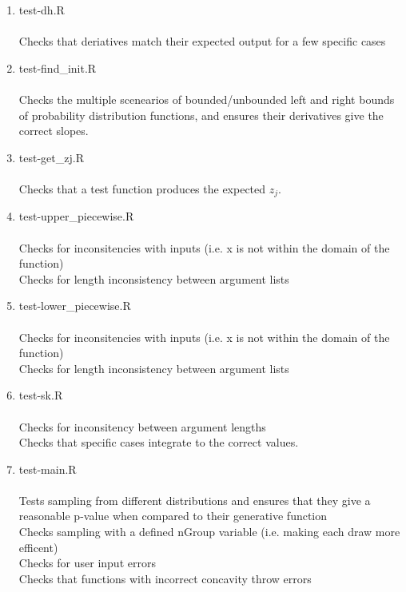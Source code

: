 \documentclass[12pt, oneside]{article}
\begin{document}
\begin{enumerate}

\item test-dh.R\\\\
Checks that deriatives match their expected output for a few specific cases

\item test-find\_init.R\\\\
Checks the multiple scenearios of bounded/unbounded left and right bounds of probability distribution functions, and ensures their derivatives give the correct slopes.

\item test-get\_zj.R\\\\
Checks that a test function produces the expected \(z_j\).

\item test-upper\_piecewise.R\\\\
Checks for inconsitencies with inputs (i.e. x is not within the domain of the function)\\
Checks for length inconsistency between argument lists

\item test-lower\_piecewise.R\\\\
Checks for inconsitencies with inputs (i.e. x is not within the domain of the function)\\
Checks for length inconsistency between argument lists

\item test-sk.R\\\\
Checks for inconsitency between argument lengths\\
Checks that specific cases integrate to the correct values.

\item test-main.R\\\\
Tests sampling from different distributions and ensures that they give a reasonable p-value when compared to their generative function\\
Checks sampling with a defined nGroup variable (i.e. making each draw more efficent)\\
Checks for user input errors\\
Checks that functions with incorrect concavity throw errors

\end{enumerate}
\end{document}
